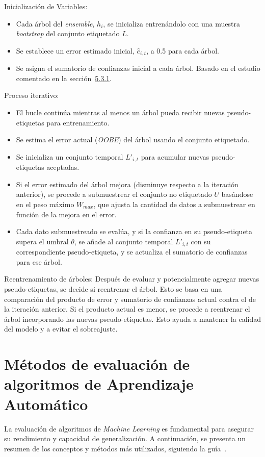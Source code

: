 Inicialización de Variables:
\begin{itemize}
	\item Cada árbol del \textit{ensemble}, $h_i$, se inicializa entrenándolo con una muestra \textit{bootstrap} del conjunto etiquetado $L$.
	\item Se establece un error estimado inicial, $\hat{e}_{i,t}$, a 0.5 para cada árbol.
	\item Se asigna el sumatorio de confianzas inicial a cada árbol. Basado en el estudio comentado en la sección~\hyperref[sec5:coforest]{5.3.1}.
\end{itemize}

Proceso iterativo:
\begin{itemize}
	\item El bucle continúa mientras al menos un árbol pueda recibir nuevas pseudo-etiquetas para entrenamiento.
	\item Se estima el error actual (\textit{OOBE}) del árbol usando el conjunto etiquetado.
	\item Se inicializa un conjunto temporal $L'_{i,t}$ para acumular nuevas pseudo-etiquetas aceptadas.
	\item Si el error estimado del árbol mejora (disminuye respecto a la iteración anterior), se procede a submuestrear el conjunto no etiquetado $U$ basándose en el peso máximo $W_{max}$, que ajusta la cantidad de datos a submuestrear en función de la mejora en el error.
	\item Cada dato submuestreado se evalúa, y si la confianza en su pseudo-etiqueta supera el umbral $\theta$, se añade al conjunto temporal $L'_{i,t}$ con su correspondiente pseudo-etiqueta, y se actualiza el sumatorio de confianzas para ese árbol.
\end{itemize}

Reentrenamiento de árboles:
Después de evaluar y potencialmente agregar nuevas pseudo-etiquetas, se decide si reentrenar el árbol. Esto se basa en una comparación del producto de error y sumatorio de confianzas actual contra el de la iteración anterior. Si el producto actual es menor, se procede a reentrenar el árbol incorporando las nuevas pseudo-etiquetas. Esto ayuda a mantener la calidad del modelo y a evitar el sobreajuste.

\section{Métodos de evaluación de algoritmos de Aprendizaje Automático}
La evaluación de algoritmos de \textit{Machine Learning} es fundamental para asegurar su rendimiento y capacidad de generalización. A continuación, se presenta un resumen de los conceptos y métodos más utilizados, siguiendo la guía~\cite{web:crossVal}.
